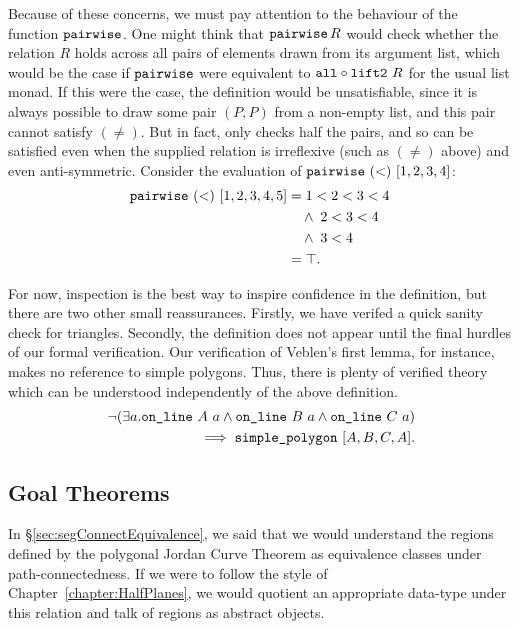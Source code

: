 Because of these concerns, we must pay attention to the behaviour of the function $\texttt{pairwise}$. One might think that $\texttt{pairwise}\, R$ would check whether the relation $R$ holds across all pairs of elements drawn from its argument list, which would be the case if $\texttt{pairwise}$ were equivalent to $\texttt{all} \circ \texttt{lift2}\ R$ for the usual list monad. If this were the case, the definition would be unsatisfiable, since it is always possible to draw some pair $(P,P)$ from a non-empty list, and this pair cannot satisfy $(\neq)$. But in fact,  only checks half the pairs, and so can be satisfied even when the supplied relation is irreflexive (such as $(\neq)$ above) and even anti-symmetric. Consider the evaluation of $\texttt{pairwise}\ (<)\ [1,2,3,4]$:
\begin{align*}
  \texttt{pairwise}\ (<)\ [1,2,3,4,5] &= 1 < 2 < 3 < 4 \\
  &\quad\wedge\; 2 < 3 < 4 \\
  &\quad\wedge\; 3 < 4\\
  & = \top.
\end{align*}

For now, inspection is the best way to inspire confidence in the definition, but there are two other small reassurances. Firstly, we have verifed a quick sanity check for triangles. Secondly, the definition does not appear until the final hurdles of our formal verification. Our verification of Veblen's first lemma, for instance, makes no reference to simple polygons. Thus, there is plenty of verified theory which can be understood independently of the above definition.
\begin{equation*}
  \begin{split}
    \; \neg(\exists a.\texttt{on\_line}\ A\ a\wedge \texttt{on\_line}\ B\ a\wedge \texttt{on\_line}\ C\ a) \\
    \implies \texttt{simple\_polygon}\ [A,B,C,A].
  \end{split}
\end{equation*}

\subsection{Goal Theorems}
In \S\ref{sec:segConnectEquivalence}, we said that we would understand the regions defined by the polygonal Jordan Curve Theorem as equivalence classes under path-connectedness. If we were to follow the style of Chapter~\ref{chapter:HalfPlanes}, we would quotient an appropriate data-type under this relation and talk of regions as abstract objects.
 
